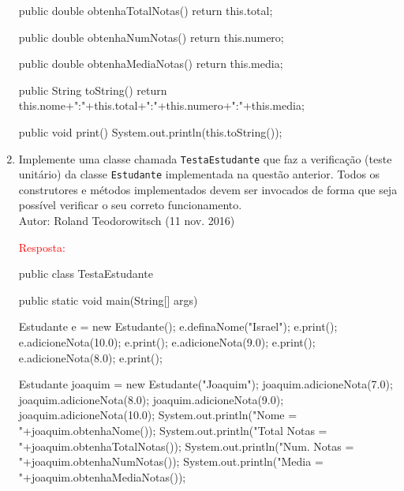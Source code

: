 \documentclass[onecolumn,a4paper,10pt]{report}
\newcommand{\+}{\, + \,}
\newcommand{\<}{\hspace*{-0.4cm}}
\begin{document}
\begin{enumerate}
{\begin{javacode}
{    public double obtenhaTotalNotas() {
        return this.total;
    }
    
    public double obtenhaNumNotas() {
        return this.numero;
    }
    
    public double obtenhaMediaNotas() {
        return this.media;
    }
    
    public String toString() {
        return this.nome+":"+this.total+":"+this.numero+":"+this.media;
    }
    
    public void print() {
        System.out.println(this.toString());
    }
    
}
\end{javacode}
}
\newpage

\item Implemente uma classe chamada \texttt{TestaEstudante} que faz a verificação (teste unitário) da classe \texttt{Estudante} implementada na questão anterior. Todos os construtores e métodos implementados devem ser invocados de forma que seja possível verificar o seu correto funcionamento.\\
{\tiny Autor: Roland Teodorowitsch (11 nov. 2016)}\\
{\tiny \textcolor{red}{Resposta:}\\
\begin{javacode}
public class TestaEstudante {
    public static void main(String[] args) {
        Estudante e = new Estudante();
        e.definaNome("Israel");
        e.print();
        e.adicioneNota(10.0);
        e.print();
        e.adicioneNota(9.0);
        e.print();
        e.adicioneNota(8.0);
        e.print();
        
        Estudante joaquim = new Estudante("Joaquim");
        joaquim.adicioneNota(7.0);
        joaquim.adicioneNota(8.0);
        joaquim.adicioneNota(9.0);
        joaquim.adicioneNota(10.0);
        System.out.println("Nome        = "+joaquim.obtenhaNome());
        System.out.println("Total Notas = "+joaquim.obtenhaTotalNotas());
        System.out.println("Num. Notas  = "+joaquim.obtenhaNumNotas());
        System.out.println("Media       = "+joaquim.obtenhaMediaNotas());
    }
}
\end{javacode}
}
\newpage


\end{enumerate}
\end{document}
